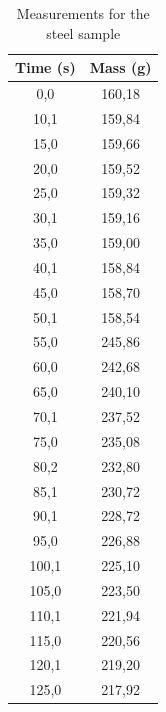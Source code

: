 \documentclass[a4paper, 12pt]{article}
\begin{document}
	\begin{table}[H]
		\centering
		\caption{Measurements for the steel sample}
		\begin{tabular}{|c | c|}
			\hline
			\textbf{Time (s)} & \textbf{Mass (g)} \\ 
			\hline
		0,0               & 160,18            \\
		10,1              & 159,84            \\
		15,0              & 159,66            \\
		20,0              & 159,52            \\
		25,0              & 159,32            \\
		30,1              & 159,16            \\
		35,0              & 159,00            \\
		40,1              & 158,84            \\
		45,0              & 158,70            \\
		50,1              & 158,54            \\
		\rowcolor[HTML]{FFFF00} 
		55,0              & 245,86            \\
		60,0              & 242,68            \\
		65,0              & 240,10            \\
		70,1              & 237,52            \\
		75,0              & 235,08            \\
		80,2              & 232,80            \\
		85,1              & 230,72            \\
		90,1              & 228,72            \\
		95,0              & 226,88            \\
		100,1             & 225,10            \\
		105,0             & 223,50            \\
		110,1             & 221,94            \\
		115,0             & 220,56            \\
		120,1             & 219,20            \\
		125,0             & 217,92            \\

\end{tabular}
\end{table}
\end{document}
